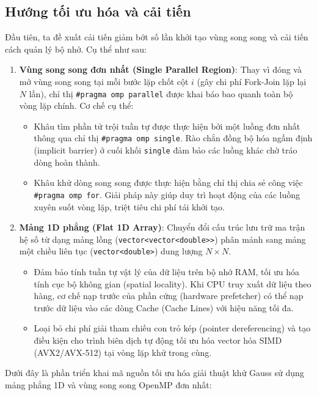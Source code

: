 \subsection{Hướng tối ưu hóa và cải tiến}
Đầu tiên, ta đề xuất cải tiến giảm bớt số lần khởi tạo vùng song song và cải tiến cách quản lý bộ nhớ. Cụ thể như sau:

\begin{enumerate}
    \item \textbf{Vùng song song đơn nhất (Single Parallel Region)}: Thay vì đóng và mở vùng song song tại mỗi bước lặp chốt cột $i$ (gây chi phí Fork-Join lặp lại $N$ lần), chỉ thị \texttt{\#pragma omp parallel} được khai báo bao quanh toàn bộ vòng lặp chính. Cơ chế cụ thể:
          \begin{itemize}
              \item Khâu tìm phần tử trội tuần tự được thực hiện bởi một luồng đơn nhất thông qua chỉ thị \texttt{\#pragma omp single}. Rào chắn đồng bộ hóa ngầm định (implicit barrier) ở cuối khối \texttt{single} đảm bảo các luồng khác chờ tráo dòng hoàn thành.
              \item Khâu khử dòng song song được thực hiện bằng chỉ thị chia sẻ công việc \texttt{\#pragma omp for}. Giải pháp này giúp duy trì hoạt động của các luồng xuyên suốt vòng lặp, triệt tiêu chi phí tái khởi tạo.
          \end{itemize}
    \item \textbf{Mảng 1D phẳng (Flat 1D Array)}: Chuyển đổi cấu trúc lưu trữ ma trận hệ số từ dạng mảng lồng (\texttt{vector<vector<double>>}) phân mảnh sang mảng một chiều liên tục (\texttt{vector<double>}) dung lượng $N \times N$.
          \begin{itemize}
              \item Đảm bảo tính tuần tự vật lý của dữ liệu trên bộ nhớ RAM, tối ưu hóa tính cục bộ không gian (spatial locality). Khi CPU truy xuất dữ liệu theo hàng, cơ chế nạp trước của phần cứng (hardware prefetcher) có thể nạp trước dữ liệu vào các dòng Cache (Cache Lines) với hiệu năng tối đa.
              \item Loại bỏ chi phí giải tham chiếu con trỏ kép (pointer dereferencing) và tạo điều kiện cho trình biên dịch tự động tối ưu hóa vector hóa SIMD (AVX2/AVX-512) tại vòng lặp khử trong cùng.
          \end{itemize}
\end{enumerate}

Dưới đây là phần triển khai mã nguồn tối ưu hóa giải thuật khử Gauss sử dụng mảng phẳng 1D và vùng song song OpenMP đơn nhất:

